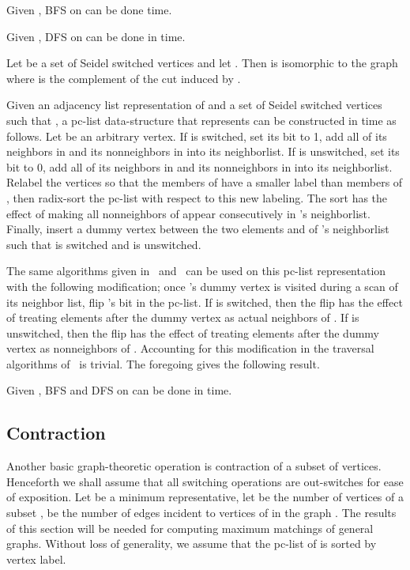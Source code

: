 \documentclass{llncs}
\begin{document}
\begin{theorem}
\cite{DahlhausGM02} Given , BFS on  can be done  time.
\end{theorem}

\begin{theorem}
\cite{DahlhausGM02,LindzeyO13} Given , DFS on  can be done in  time.
\end{theorem}
\begin{proposition}
Let  be a set of Seidel switched vertices and let .  Then  is isomorphic to the graph  where  is the complement of the cut induced by .
\end{proposition}
Given an adjacency list representation of  and a set of Seidel switched vertices  such that , a pc-list data-structure that represents  can be constructed in  time as follows.  Let  be an arbitrary vertex. If  is switched, set its bit to 1, add all of its neighbors in  and its nonneighbors in  into its neighborlist.  If  is unswitched, set its bit to 0, add all of its neighbors in  and its nonneighbors in  into its neighborlist. Relabel the vertices so that the members of  have a smaller label than members of , then radix-sort the pc-list with respect to this new labeling.  The sort has the effect of making all nonneighbors of  appear consecutively in 's neighborlist.  Finally, insert a dummy vertex between the two elements  and  of 's neighborlist such that  is switched and  is unswitched.

The same algorithms given in~\cite{DahlhausGM02} and~\cite{LindzeyO13} can be used on this pc-list representation with the following modification; once 's dummy vertex is visited during a scan of its neighbor list, flip 's bit in the pc-list.  If  is switched, then the flip has the effect of treating elements after the dummy vertex as actual neighbors of . If  is unswitched, then the flip has the effect of treating elements after the dummy vertex as nonneighbors of .  Accounting for this modification in the traversal algorithms of~\cite{DahlhausGM02,LindzeyO13} is trivial.  The foregoing gives the following result.
\begin{theorem}
Given , BFS and DFS on  can be done in  time.
\end{theorem}

\subsection{Contraction}

\noindent Another basic graph-theoretic operation is contraction of a subset of vertices.  Henceforth we shall assume that all switching operations are out-switches for ease of exposition.  Let  be a minimum representative, let  be the number of vertices of a subset ,  be the number of edges incident to vertices of  in the graph .  The results of this section will be needed for computing maximum matchings of general graphs.  Without loss of generality, we assume that the pc-list of  is sorted by vertex label.
\end{document}
